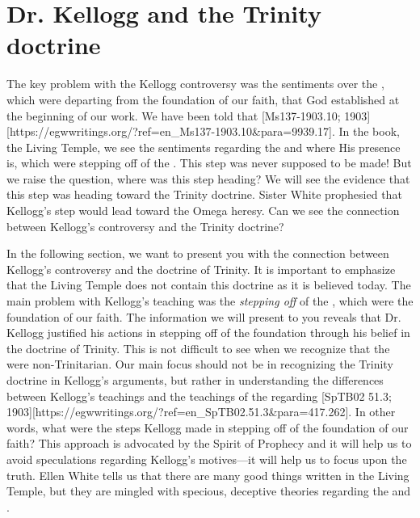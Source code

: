 \chapter{Dr. Kellogg and the Trinity doctrine}

The key problem with the Kellogg controversy was the sentiments over the , which were departing from the foundation of our faith, that God established at the beginning of our work. We have been told that [Ms137-1903.10; 1903][https://egwwritings.org/?ref=en\_Ms137-1903.10&para=9939.17]. In the book, the Living Temple, we see the sentiments regarding the  and where His presence is, which were stepping off of the . This step was never supposed to be made! But we raise the question, where was this step heading? We will see the evidence that this step was heading toward the Trinity doctrine. Sister White prophesied that Kellogg’s step would lead toward the Omega heresy. Can we see the connection between Kellogg’s controversy and the Trinity doctrine?

In the following section, we want to present you with the connection between Kellogg’s controversy and the doctrine of Trinity. It is important to emphasize that the Living Temple does not contain this doctrine as it is believed today. The main problem with Kellogg’s teaching was the \textit{stepping off} of the , which were the foundation of our faith. The information we will present to you reveals that Dr. Kellogg justified his actions in stepping off of the foundation through his belief in the doctrine of Trinity. This is not difficult to see when we recognize that the  were non-Trinitarian. Our main focus should not be in recognizing the Trinity doctrine in Kellogg's arguments, but rather in understanding the differences between Kellogg’s teachings and the teachings of the  regarding [SpTB02 51.3; 1903][https://egwwritings.org/?ref=en\_SpTB02.51.3&para=417.262]. In other words, what were the steps Kellogg made in stepping off of the foundation of our faith? This approach is advocated by the Spirit of Prophecy and it will help us to avoid speculations regarding Kellogg’s motives—it will help us to focus upon the truth. Ellen White tells us that there are many good things written in the Living Temple, but they are mingled with specious, deceptive theories regarding the  and .

